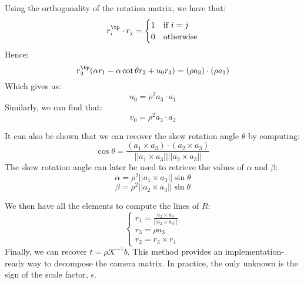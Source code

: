 Using the orthogonality of the rotation matrix, we have that:
\begin{equation*}
    r_i^\tp\cdot r_j = \begin{cases}
        1 & \text{if } i=j\\
        0 & \text{otherwise}
    \end{cases}
\end{equation*}
Hence:
\begin{equation*}
    r_3^\tp(\alpha r_1-\alpha\cot\theta r_2 + u_0r_3) = (\rho a_3)\cdot(\rho a_1)
\end{equation*}
Which gives us:
\begin{equation*}
    u_0 = \rho^2a_3\cdot a_1
\end{equation*}
Similarly, we can find that:
\begin{equation*}
    v_0 = \rho^2a_3\cdot a_2
\end{equation*}

It can also be shown that we can recover the skew rotation angle $\theta$ by computing:
\begin{equation*}
    \cos\theta = \frac{(a_1\times a_3)\cdot(a_2\times a_3)}{||a_1\times a_3||||a_2\times a_3||}
\end{equation*}
The skew rotation angle can later be used to retrieve the values of $\alpha$ and $\beta$:
\begin{equation*}
\alpha = \rho^2||a_1\times a_3||\sin\theta
\end{equation*}
\begin{equation*}
\beta = \rho^2||a_2\times a_3||\sin\theta
\end{equation*}

We then have all the elements to compute the lines of $R$:
\begin{equation*}
\begin{cases}r_1 = \frac{a_2\times a_3}{||a_2\times a_3||}\\
r_3 = \rho a_3\\
r_2 = r_3\times r_1
\end{cases}
\end{equation*}
Finally, we can recover $t=\rho\mathcal{K}^{-1}b$. This method provides an implementation-ready way to decompose the camera matrix. In practice, the only unknown is the sign of the scale factor, $\epsilon$.